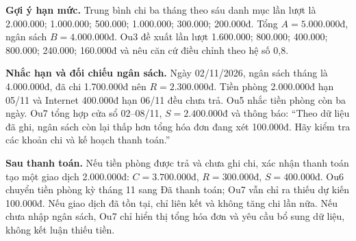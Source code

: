 \documentclass[11pt,a4paper]{article}
\begin{document}
\textbf{Gợi ý hạn mức.} Trung bình chi ba tháng theo sáu danh mục lần lượt là 2.000.000; 1.000.000; 500.000; 1.000.000; 300.000; 200.000đ. Tổng $A=5.000.000$đ, ngân sách $B=4.000.000$đ. Ou3 đề xuất lần lượt 1.600.000; 800.000; 400.000; 800.000; 240.000; 160.000đ và nêu căn cứ điều chỉnh theo hệ số 0,8.

\textbf{Nhắc hạn và đối chiếu ngân sách.} Ngày 02/11/2026, ngân sách tháng là 4.000.000đ, đã chi 1.700.000đ nên $R=2.300.000$đ. Tiền phòng 2.000.000đ hạn 05/11 và Internet 400.000đ hạn 06/11 đều chưa trả. Ou5 nhắc tiền phòng còn ba ngày. Ou7 tổng hợp cửa sổ 02--08/11, $S=2.400.000$đ và thông báo: ``Theo dữ liệu đã ghi, ngân sách còn lại thấp hơn tổng hóa đơn đang xét 100.000đ. Hãy kiểm tra các khoản chi và kế hoạch thanh toán.''

\textbf{Sau thanh toán.} Nếu tiền phòng được trả và chưa ghi chi, xác nhận thanh toán tạo một giao dịch 2.000.000đ: $C=3.700.000$đ, $R=300.000$đ, $S=400.000$đ. Ou6 chuyển tiền phòng kỳ tháng 11 sang Đã thanh toán; Ou7 vẫn chỉ ra thiếu dự kiến 100.000đ. Nếu giao dịch đã tồn tại, chỉ liên kết và không tăng chi lần nữa. Nếu chưa nhập ngân sách, Ou7 chỉ hiển thị tổng hóa đơn và yêu cầu bổ sung dữ liệu, không kết luận thiếu tiền.
\end{document}
